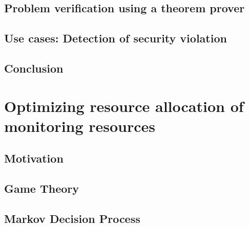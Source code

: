 \documentclass[a4paper, 11pt]{article}
\begin{document}
\subsection{Problem verification using a theorem prover}


\subsection{Use cases: Detection of security violation}


\newpage
\subsection{Conclusion}


\newpage
\section{Optimizing resource allocation of monitoring resources}
\label{sec:RAprob}
\subsection{Motivation}


\newpage
\subsection{Game Theory}


\newpage
\subsection{Markov Decision Process}


\newpage

\newpage
{}


\newpage
\begin{appendices}

\newpage
% 
\newpage

\end{appendices}
\end{document}
